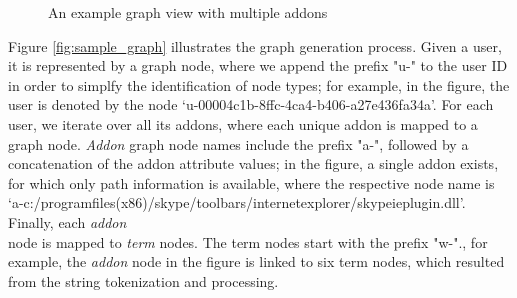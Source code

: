 \documentclass[11pt,oneside]{book}
\begin{document}
\begin{figure}
    \caption{An example graph view with multiple addons}
    \label{fig:sample_graph2}
  \end{figure}
  
Figure \ref{fig:sample_graph} illustrates the graph generation process. Given a user, it is represented by a graph node, where we append the prefix "u-" to the user ID in order to simplfy the identification of node types; for example, in the figure, the user is denoted by the node `u-00004c1b-8ffc-4ca4-b406-a27e436fa34a'. For each user, we iterate over all its addons, where each unique addon is mapped to a graph node. {\it Addon} graph node names include the prefix "a-", followed by a concatenation of the addon attribute values; in the figure, a single addon exists, for which only path information is available, where the respective node name is\\
`a-c:/programfiles(x86)/skype/toolbars/internetexplorer/skypeieplugin.dll'. Finally, each {\it addon} \\
node is mapped to {\it term} nodes. The term nodes start with the prefix "w-"., for example, the {\it addon} node in the figure is linked to six term nodes, which resulted from the string tokenization and processing. 
  
\end{document}
